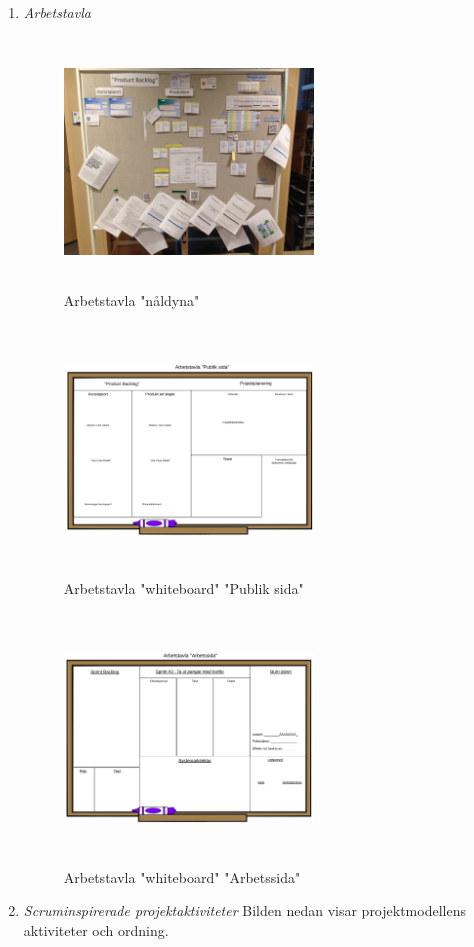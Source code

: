 \documentclass[conference]{IEEEtran}
\begin{document}
\begin{enumerate}
    \item \textit{Arbetstavla}
    \begin{figure}[htbp]
        \centerline{\includegraphics[max height=250px, max width=250px]{images/arbetstavla.jpg}}
        \caption{Arbetstavla "nåldyna"}
        \label{fig}
    \end{figure}
    
    \begin{figure}[htbp]
        \centerline{\includegraphics[max height=250px, max width=250px]{images/lucidtavla.png}}
        \caption{Arbetstavla "whiteboard" "Publik sida"}
        \label{fig}
    \end{figure}

    \begin{figure}[htbp]
        \centerline{\includegraphics[max height=250px, max width=250px]{images/lucidbaksida.png}}
        \caption{Arbetstavla "whiteboard" "Arbetssida"}
        \label{fig}
    \end{figure}
    \item \textit{Scruminspirerade projektaktiviteter}
    Bilden nedan visar projektmodellens aktiviteter och ordning.


\end{enumerate}
\end{document}
